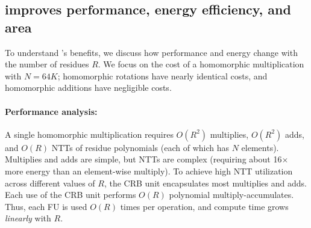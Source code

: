 \begin{comment}
\paragraph{Why not handle variable word sizes in hardware?}
All prior FHE accelerators use a fixed-width word size, but since we can change the hardware as well,
it's worth asking whether we could change hardware to support multiple word sizes to adapt to RNS-CKKS representation,
instead of using \name.
However, the different approaches to do this would introduce major problems.
A common approach (e.g., in CPUs and GPUs) is to subdivide a wide datapath (e.g., supporting a single 64-bit operation or two 32-bit operations),
but this is still too coarse for our purposes, and makes poor utilization of multipliers (e.g., a single 64-bit multiplier has the area of roughly four 32-bit multipliers).
A more aggressive option would be to use multi-cycle functional units with a very narrow hardware datapath (e.g., 8 bits),
and perform each wide operation over multiple cycle (e.g., taking tens of cycles per multiply).
While this approach is finer-grained, it would suffer from high register overheads,
because modular multiplications use wide intermediate values.
For example, CraterLake's pipelined multipliers already spend 30\% of area on registers
and 70\% on combinational logic. 
Multi-cycle multipliers would be dominated by registers, and since each multiplier would be slower,
significantly more area would be needed for the same throughput.
\end{comment}

\subsection{\name improves performance, energy efficiency, and area}
\label{sec:benefits}

To understand \name's benefits, we discuss how performance and energy change
with the number of residues $R$.
We focus on the cost of a homomorphic multiplication with $N=64K$; homomorphic
rotations have nearly identical costs, and homomorphic additions have
negligible costs.

\paragraph{Performance analysis:}
A single homomorphic multiplication requires $O(R^2)$ multiplies, $O(R^2)$
adds, and $O(R)$ NTTs of residue polynomials (each of which has $N$ elements).
Multiplies and adds are simple, but NTTs are complex (requiring about
16$\times$ more energy than an element-wise multiply).
To achieve high NTT utilization across different values of $R$, the CRB unit
encapsulates most multiplies and adds.
Each use of the CRB unit performs $O(R)$ polynomial multiply-accumulates.
Thus, each FU is used $O(R)$ times per operation, and compute time grows
\emph{linearly} with $R$.

